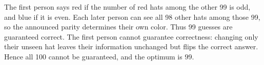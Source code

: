 The first person says red if the number of red hats among the other 99 is odd, and blue if it is even. Each later person can see all 98 other hats among those 99, so the announced parity determines their own color. Thus 99 guesses are guaranteed correct. The first person cannot guarantee correctness: changing only their unseen hat leaves their information unchanged but flips the correct answer. Hence all 100 cannot be guaranteed, and the optimum is $\boxed{99}$.
